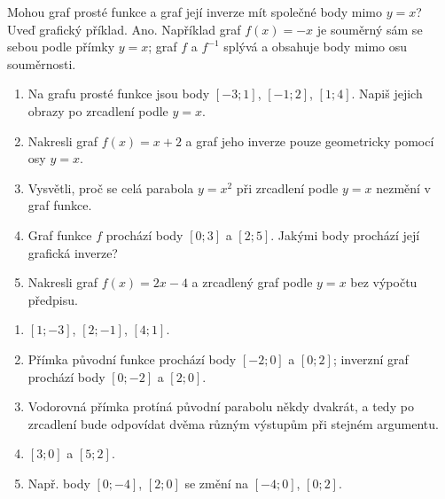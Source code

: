 \documentclass[11pt,a4paper]{article}
\begin{document}
\begin{zadaniReseniBox}[title={Rozšíření 1}]
Mohou graf prosté funkce a graf její inverze mít společné body mimo $y=x$? Uveď grafický příklad.
\tcblower
Ano. Například graf $f(x)=-x$ je souměrný sám se sebou podle přímky $y=x$; graf $f$ a $f^{-1}$ splývá a obsahuje body mimo osu souměrnosti.
\end{zadaniReseniBox}

\begin{zadaniReseniBox}[title={Domácí úkol}]
\begin{enumerate}[label=\alph*)]
\item Na grafu prosté funkce jsou body $[-3;1]$, $[-1;2]$, $[1;4]$. Napiš jejich obrazy po zrcadlení podle $y=x$.
\item Nakresli graf $f(x)=x+2$ a graf jeho inverze pouze geometricky pomocí osy $y=x$.
\item Vysvětli, proč se celá parabola $y=x^2$ při zrcadlení podle $y=x$ nezmění v graf funkce.
\item Graf funkce $f$ prochází body $[0;3]$ a $[2;5]$. Jakými body prochází její grafická inverze?
\item Nakresli graf $f(x)=2x-4$ a zrcadlený graf podle $y=x$ bez výpočtu předpisu.
\end{enumerate}
\tcblower
\begin{enumerate}[label=\alph*)]
\item $[1;-3]$, $[2;-1]$, $[4;1]$.
\item Přímka původní funkce prochází body $[-2;0]$ a $[0;2]$; inverzní graf prochází body $[0;-2]$ a $[2;0]$.
\item Vodorovná přímka protíná původní parabolu někdy dvakrát, a tedy po zrcadlení bude odpovídat dvěma různým výstupům při stejném argumentu.
\item $[3;0]$ a $[5;2]$.
\item Např. body $[0;-4]$, $[2;0]$ se změní na $[-4;0]$, $[0;2]$.
\end{enumerate}
\end{zadaniReseniBox}
\end{document}
